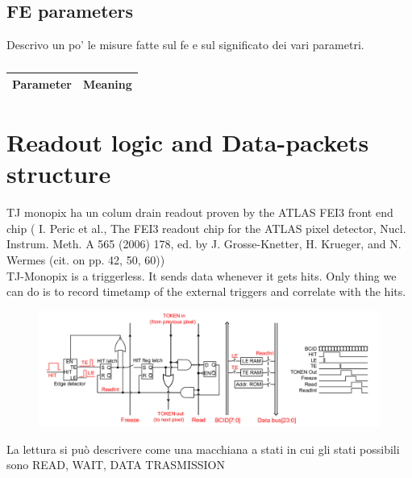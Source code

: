    \subsection{FE parameters}
    Descrivo un po' le misure fatte sul fe e sul significato dei vari parametri.\\
    \begin{table}
        \begin{center}
        \begin{tabular}{|c | c |}
        \hline
        Parameter & Meaning\\
        \hline
        \hline
    
        \hline
        \end{tabular}
        \caption{}
        \label{tab:FE-parameters}
        \end{center}
     \end{table}
    
\section{Readout logic and Data-packets structure}
    TJ monopix ha un colum drain readout proven by the ATLAS FEI3 front end chip (
    I. Peric et al., The FEI3 readout chip for the ATLAS pixel detector,
    Nucl. Instrum. Meth. A 565 (2006) 178, ed. by J. Grosse-Knetter, H. Krueger, and N. Wermes
    (cit. on pp. 42, 50, 60))\\

    TJ-Monopix is a triggerless. It sends data whenever it gets hits. Only thing we can do is to record timetamp of the external triggers and correlate with the hits. 
    \begin{figure}[h!]
        \centering
        \includegraphics[width=.7\linewidth]{figures/Monopix1/Monopix1_readout_schematics.png}
        \caption{}
        \label{fig:Monopix1_readout_schematics}
    \end{figure}

    La lettura si può descrivere come una macchiana a stati in cui gli stati possibili sono READ, WAIT, DATA TRASMISSION\\

